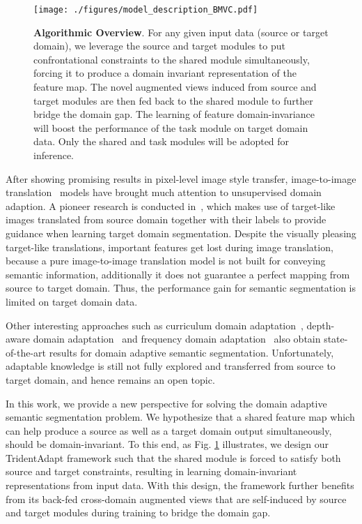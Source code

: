 \documentclass{bmvc2k}
\newcommand{\Fig}[1]{Fig. \ref{fig:#1}}
\begin{document}
\begin{figure}
\centering
\texttt{[image: ./figures/model\_description\_BMVC.pdf]}
\caption{ {\bf Algorithmic Overview}. For any given input data (source or target domain), we leverage the source and target modules to put confrontational constraints to the shared module simultaneously, forcing it to produce a domain invariant representation of the feature map. The novel augmented views induced from source and target modules are then fed back to the shared module to further bridge the domain gap. The learning of feature domain-invariance will boost the performance of the task module on target domain data. Only the shared and task modules will be adopted for inference. }
\label{fig:model_description}
\vspace{-3.5mm}
\end{figure}



After showing promising results in pixel-level image style transfer, image-to-image translation~\cite{huang2018multimodal,liu2017unsupervised,zhu2017unpaired} models have brought much attention to unsupervised domain adaption. A pioneer research is conducted in~\cite{hoffman2018cycada}, which makes use of target-like images translated from source domain together with their labels to provide guidance when learning target domain segmentation. Despite the visually pleasing target-like translations, important features get lost during image translation, because a pure image-to-image translation model is not built for conveying semantic information, additionally it does not guarantee a perfect mapping from source to target domain. Thus, the performance gain for semantic segmentation is limited on target domain data.



Other interesting approaches such as curriculum domain adaptation~\cite{zhang2017curriculum}, depth-aware domain adaptation~\cite{vu2019dada} and frequency domain adaptation~\cite{yang2020fda} also obtain state-of-the-art results for domain adaptive semantic segmentation. Unfortunately, adaptable knowledge is still not fully explored and transferred from source to target domain, and hence remains an open topic.

In this work, we provide a new perspective for solving the domain adaptive semantic segmentation problem. We hypothesize that a shared feature map which can help produce a source as well as a target domain output simultaneously, should be domain-invariant. To this end, as \Fig{model_description} illustrates, we design our TridentAdapt framework such that the shared module is forced to satisfy both source and target constraints, resulting in learning domain-invariant representations from input data. With this design, the framework further benefits from its back-fed cross-domain augmented views that are self-induced by source and target modules during training to bridge the domain gap.  
\end{document}
